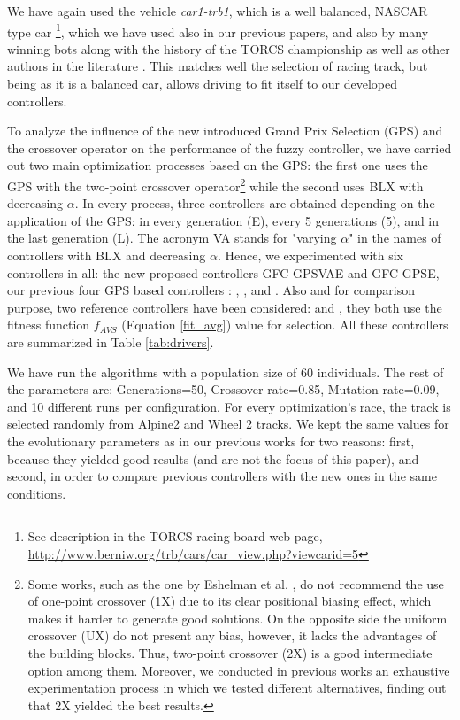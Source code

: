 \documentclass[10pt,journal,compsoc]{IEEEtran}
\begin{document}
We have again used the vehicle \mbox{\textit{car1-trb1}},
which is a well balanced, NASCAR type car \footnote{See description in
  the TORCS racing board web page,
  \url{http://www.berniw.org/trb/cars/car_view.php?viewcarid=5}},
which we have used also in our previous papers, and also by many
winning bots  along with the history of the TORCS championship
\cite{torcs5} as well as other authors in the literature
\cite{auteur2010}. This matches well the selection
of racing track, but being as it is a balanced car, allows driving to
fit itself to our developed controllers.


To analyze the influence of the new introduced Grand Prix Selection
(GPS) and the crossover operator on the performance of the fuzzy
controller, we have carried out two main optimization processes based
on the GPS: the first one uses the GPS with the two-point crossover
operator\footnote{	Some works, such as the one by Eshelman et al. \cite{eshelman1989biases}, do not recommend the use of one-point crossover (1X) due to its clear positional biasing effect, which makes it harder to generate good solutions. On the opposite side the uniform crossover (UX) do not present any bias, however, it lacks the advantages of the building blocks. Thus, two-point crossover (2X) is a good intermediate option among them. Moreover, we conducted in previous works an exhaustive experimentation process in which we tested different alternatives, finding out that 2X yielded the best results.} while the second uses BLX with decreasing $\alpha$.
In every process, three controllers are obtained depending on the application of the GPS: in every generation (E), every 5 generations (5), and in the last generation (L). The acronym VA  stands for "varying $\alpha$" in the names of  controllers with BLX and decreasing $\alpha$.
Hence, we experimented with six controllers in all: the new
proposed controllers {\sf GFC-GPSVAE} and {\sf GFC-GPSE}, our previous four GPS based controllers \cite{DBLP:conf/cig/SalemMG19}: {}, {},{} and {}.
Also and for comparison purpose, two reference controllers have been considered: {}\cite{DBLP:conf/cig/SalemMG19} and {}\cite{salem_cig2018}, they both use the fitness function $f_{AVS}$ (Equation \ref{fit_avg}) value for selection.
All these controllers are summarized in Table \ref{tab:drivers}. 


We have run the algorithms with a population size of 60
individuals. The rest of the parameters are: Generations=50, Crossover
rate=0.85, Mutation rate=0.09, and 10 different runs per
configuration.  For every optimization's race, the track is selected
randomly from Alpine2 and Wheel 2 tracks.  We kept the same values for
the evolutionary parameters as in our previous works for two reasons:
first, because they yielded good results (and are not the focus of
this paper), and second, in order to compare previous controllers with
the new ones in the same conditions.
\end{document}
